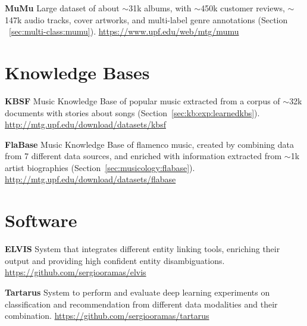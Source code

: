\vspace{0.2cm}

\noindent \textbf{MuMu} Large dataset of about $\sim$31k albums, with $\sim$450k customer reviews, $\sim$147k audio tracks, cover artworks, and multi-label genre annotations (Section ~\ref{sec:multi-class:mumu}). \url{https://www.upf.edu/web/mtg/mumu}

\section{Knowledge Bases}

\noindent \textbf{KBSF} Music Knowledge Base of popular music extracted from a corpus of $\sim$32k documents with stories about songs (Section~\ref{sec:kb:exp:learnedkbs}). \url{http://mtg.upf.edu/download/datasets/kbsf}

\vspace{0.2cm}

\noindent \textbf{FlaBase} Music Knowledge Base of flamenco music, created by combining data from 7 different data sources, and enriched with information extracted from $\sim$1k artist biographies (Section~\ref{sec:musicology:flabase}). \url{http://mtg.upf.edu/download/datasets/flabase}


\section{Software}

\noindent \textbf{ELVIS} System that integrates different entity linking tools, enriching their output and providing high confident entity disambiguations. \url{https://github.com/sergiooramas/elvis}

\vspace{0.2cm}

\noindent \textbf{Tartarus} System to perform and evaluate deep learning experiments on classification and recommendation from different data modalities and their combination. \url{https://github.com/sergiooramas/tartarus}
 